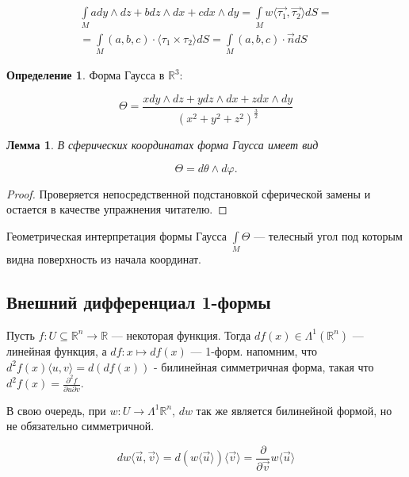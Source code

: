 \documentclass[a5paper]{article}
\newcounter{through}
\theoremstyle{plain}
\newtheorem{lemma}[through]{Лемма}
\theoremstyle{definition}
\newtheorem{definition}[through]{Определение}
\numberwithin{through}{section}
\numberwithin{equation}{section}
\begin{document}
\begin{multline*}
	\int\limits_{M} a dy \wedge dz + b dz \wedge dx + c dx \wedge dy = \int\limits_{M} w \langle \vec{\tau_1}, \vec{\tau_2} \rangle dS = \\ = \int\limits_{M} (a, b, c) \cdot \langle \tau_1 \times \tau_2 \rangle dS = \int\limits_{M} (a, b, c) \cdot \vec{n} dS
\end{multline*}

\begin{definition}
	Форма Гаусса в $\mathbb{R}^3$:
	
	\begin{equation*}
		\Theta = \frac{x dy \wedge dz + y dz \wedge dx + z dx \wedge dy}{(x^2 + y^2 + z^2)^{\frac{3}{2}}}
	\end{equation*}
\end{definition}

\begin{lemma}
	В сферических координатах форма Гаусса имеет вид
	
	\begin{equation*}
	\Theta = d\theta \wedge d\varphi.
	\end{equation*}
\end{lemma}
\begin{proof}
	Проверяется непосредственной подстановкой сферической замены и остается в качестве упражнения читателю.
\end{proof}

Геометрическая интерпретация формы Гаусса $\int\limits_{M} \Theta$ --- телесный угол под которым видна поверхность из начала координат.

\subsection{Внешний дифференциал 1-формы}

Пусть $f : U \subseteq \mathbb{R}^n \to \mathbb{R}$ --- некоторая функция. Тогда $d f(x) \in \Lambda^1(\mathbb{R}^n)$ --- линейная функция, а $df : x \mapsto df(x)$ --- 1-форм. напомним, что $d^2 f(x) \langle u, v \rangle = d (d f(x)) $ - билинейная симметричная форма, такая что $d^2 f(x) = \frac{\partial^2 f}{\partial u \partial v}$.

В свою очередь, при $w : U \to \Lambda^1 {\mathbb{R}^n}$, $dw$ так же является билинейной формой, но не обязательно симметричной.

\begin{equation*}
dw \langle \vec{u}, \vec{v} \rangle = d (w \langle \vec{u} \rangle ) \langle \vec{v} \rangle = \frac{\partial}{\partial \vec{v}} w \langle \vec{u} \rangle
\end{equation*}
\end{document}

